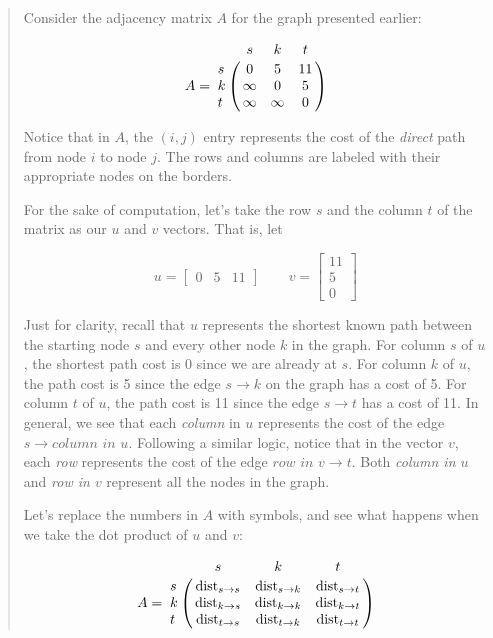 \documentclass[12pt]{article}
\begin{document}
\begin{quote}
    Consider the adjacency matrix $A$ for the graph presented earlier:

    \[
        A =
        \bordermatrix{
            & s & k & t \cr
            s & 0 & 5 & 11 \cr
            k & \infty & 0 & 5 \cr
            t & \infty & \infty & 0 \cr
        }
    \]

    Notice that in $A$, the $(i, j)$ entry represents the cost of the \emph{direct} path from node $i$ to node $j$. The rows and columns are labeled with their appropriate nodes on the borders.

    For the sake of computation, let's take the row $s$ and the column $t$ of the matrix as our $u$ and $v$ vectors. That is, let

    \[
        u =
        \begin{bmatrix}
            0 & 5 & 11
        \end{bmatrix}
        \qquad
        v =
        \begin{bmatrix}
            11 \\
            5 \\
            0
        \end{bmatrix}
    \]

    Just for clarity, recall that $u$ represents the shortest known path between the starting node $s$ and every other node $k$ in the graph. For column $s$ of $u$, the shortest path cost is 0 since we are already at $s$. For column $k$ of $u$, the path cost is 5 since the edge $s \to k$ on the graph has a cost of 5. For column $t$ of $u$, the path cost is 11 since the edge $s \to t$ has a cost of 11. In general, we see that each \emph{column} in $u$ represents the cost of the edge $s \to \textit{column in u}$. Following a similar logic, notice that in the vector $v$, each \emph{row} represents the cost of the edge $\textit{row in v} \to t$. Both \textit{column in $u$} and \textit{row in $v$} represent all the nodes in the graph.

    Let's replace the numbers in $A$ with symbols, and see what happens when we take the dot product of $u$ and $v$:

    \[
        A =
        \bordermatrix{
            & s & k & t \cr
            s & \mathrm{dist}_{s \to s} & \mathrm{dist}_{s \to k} & \mathrm{dist}_{s \to t} \cr
            k & \mathrm{dist}_{k \to s} & \mathrm{dist}_{k \to k} & \mathrm{dist}_{k \to t} \cr
            t & \mathrm{dist}_{t \to s} & \mathrm{dist}_{t \to k} & \mathrm{dist}_{t \to t} \cr
        }
    \]
\end{quote}
\end{document}
